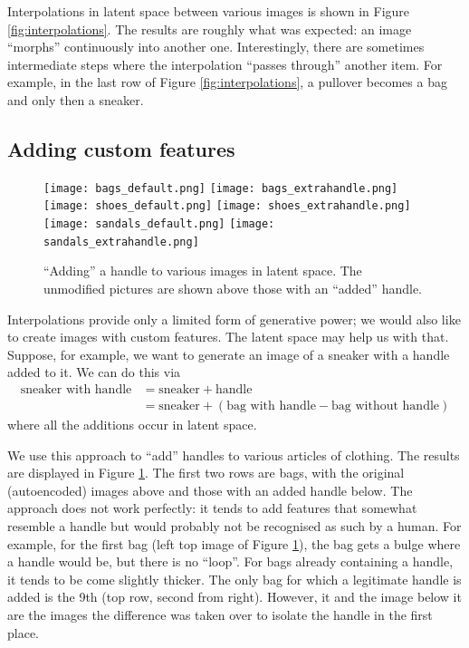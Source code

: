 \documentclass[]{article}
\begin{document}
Interpolations in latent space between various images is shown in Figure \ref{fig:interpolations}. The results are roughly what was expected: an image ``morphs'' continuously into another one. Interestingly, there are sometimes intermediate steps where the interpolation ``passes through'' another item. For example, in the last row of Figure \ref{fig:interpolations}, a pullover becomes a bag and only then a sneaker.


\subsection{Adding custom features}
\label{sec:generating:features}

\begin{figure}
  \centering
  \texttt{[image: bags\_default.png]}
  \texttt{[image: bags\_extrahandle.png]}
  \texttt{[image: shoes\_default.png]}
  \texttt{[image: shoes\_extrahandle.png]}
  \texttt{[image: sandals\_default.png]}
  \texttt{[image: sandals\_extrahandle.png]}
  \caption{``Adding'' a handle to various images in latent space. The unmodified pictures are shown above those with an ``added'' handle.}
  \label{fig:extrahandles}
\end{figure}

Interpolations provide only a limited form of generative power; we would also like to create images with custom features. The latent space may help us with that. Suppose, for example, we want to generate an image of a sneaker with a handle added to it. We can do this via
\begin{align}
  \label{eq:sneaker_handle}
  \text{sneaker with handle} &= \text{sneaker} + \text{handle} \\
  &= \text{sneaker} + (\text{bag with handle} - \text{bag without handle})
\end{align}
where all the additions occur in latent space.

We use this approach to ``add'' handles to various articles of clothing. The results are displayed in Figure \ref{fig:extrahandles}. The first two rows are bags, with the original (autoencoded) images above and those with an added handle below. The approach does not work perfectly: it tends to add features that somewhat resemble a handle but would probably not be recognised as such by a human. For example, for the first bag (left top image of Figure \ref{fig:extrahandles}), the bag gets a bulge where a handle would be, but there is no ``loop''. For bags already containing a handle, it tends to be come slightly thicker. The only bag for which a legitimate handle is added is the 9th (top row, second from right). However, it and the image below it are the images the difference was taken over to isolate the handle in the first place. 
\end{document}

